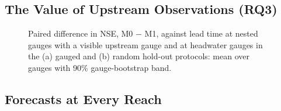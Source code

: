 \subsection{The Value of Upstream Observations (RQ3)}
\label{sec:res-rq3}

\begin{figure}
\caption{Paired difference in NSE, M0 $-$ M1, against lead time at nested gauges with a visible upstream gauge and at headwater gauges in the (a) gauged and (b) random hold-out protocols: mean over gauges with 90\% gauge-bootstrap band.}
\label{fig:upstream}
\end{figure}

\subsection{Forecasts at Every Reach}
\label{sec:res-reach}

